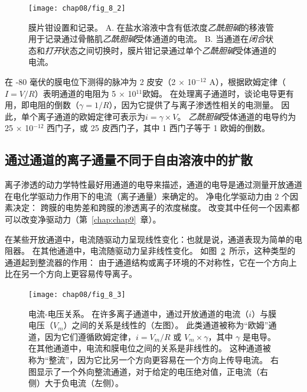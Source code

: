 \begin{figure}[htbp]
	\centering
	\texttt{[image: chap08/fig\_8\_2]}
	\caption{膜片钳设置和记录。
	A. 在盐水溶液中含有低浓度\textit{乙酰胆碱}的移液管用于记录通过骨骼肌\textit{乙酰胆碱}受体通道的电流\cite{alberts2017molecular}。
	B. 当通道在\textit{闭合}状态和\textit{打开}状态之间切换时，膜片钳记录通过单个\textit{乙酰胆碱}受体通道的电流。}
	\label{fig:8_2}
\end{figure}



在 -80 毫伏的膜电位下测得的脉冲为 2 皮安（2 $\times$ 10$^{-12}$ A），根据欧姆定律（$I = V/R$）表明通道的电阻为 5 $\times$ 10$^{11}$欧姆。
在处理离子通道时，谈论电导更有用，即电阻的倒数（$\gamma = 1/R$），因为它提供了与离子渗透性相关的电测量。
因此，单个离子通道的欧姆定律可表示为$i=\gamma \times V$。
\textit{乙酰胆碱}受体通道的电导约为 25 $\times$ 10$^{-12}$ 西门子，或 25 皮西门子，其中 1 西门子等于 1 欧姆的倒数。



\subsection{通过通道的离子通量不同于自由溶液中的扩散}

离子渗透的动力学特性最好用通道的电导来描述，通道的电导是通过测量开放通道在电化学驱动力作用下的电流（离子通量）来确定的。
净电化学驱动力由 2 个因素决定：
跨膜的电势差和跨膜的渗透离子的浓度梯度。
改变其中任何一个因素都可以改变净驱动力（第~\ref{chap:chap9}~章）。


在某些开放通道中，电流随驱动力呈现线性变化：也就是说，通道表现为简单的电阻器。
在其他通道中，电流随驱动力呈非线性变化。
如图~\ref{fig:8_3}~所示，这种类型的通道起到整流器的作用：
由于通道结构或离子环境的不对称性，它在一个方向上比在另一个方向上更容易传导离子。


\begin{figure}[htbp]
	\centering
	\texttt{[image: chap08/fig\_8\_3]}
	\caption{电流-电压关系。
		在许多离子通道中，通过开放通道的电流（$i$）与膜电压（$V_m$）之间的关系是线性的（左图）。
		此类通道被称为“欧姆”通道，因为它们遵循欧姆定律，$i = V_m /R$ 或 $ V_m \times \gamma $，其中 $\gamma$ 是电导。
		在其他通道中，电流和膜电位之间的关系是非线性的。
		这种通道被称为“整流”，因为它比另一个方向更容易在一个方向上传导电流。
		右图显示了一个外向整流通道，对于给定的电压绝对值，正电流（右侧）大于负电流（左侧）。}
	\label{fig:8_3}
\end{figure}


